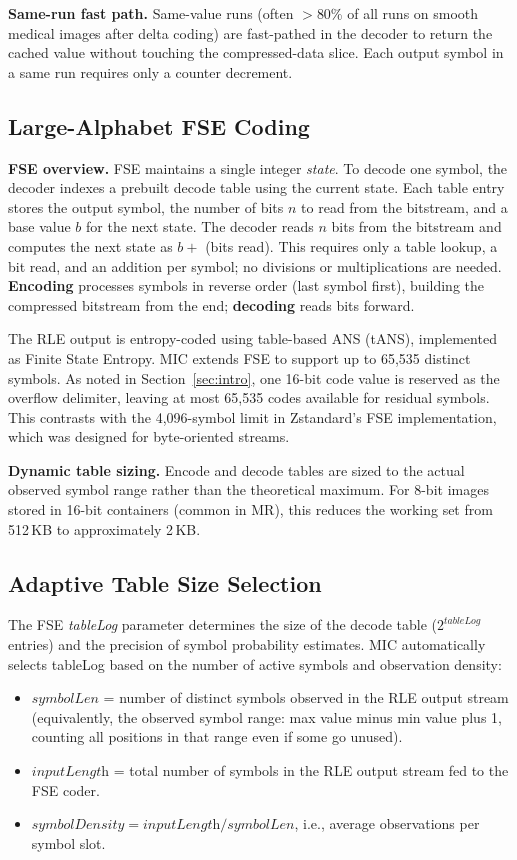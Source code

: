 \documentclass[journal]{IEEEtran}
\begin{document}
\textbf{Same-run fast path.} Same-value runs (often $>$80\% of all runs on
smooth medical images after delta coding) are fast-pathed in the decoder to
return the cached value without touching the compressed-data slice. Each output
symbol in a same run requires only a counter decrement.

\subsection{Large-Alphabet FSE Coding}

\textbf{FSE overview.} FSE maintains a single integer \emph{state}. To decode
one symbol, the decoder indexes a prebuilt decode table using the current state.
Each table entry stores the output symbol, the number of bits $n$ to read from
the bitstream, and a base value $b$ for the next state. The decoder reads $n$
bits from the bitstream and computes the next state as $b +$ (bits read). This
requires only a table lookup, a bit read, and an addition per symbol; no
divisions or multiplications are needed. \textbf{Encoding} processes symbols in
reverse order (last symbol first), building the compressed bitstream from the
end; \textbf{decoding} reads bits forward.

The RLE output is entropy-coded using table-based ANS (tANS), implemented as
Finite State Entropy. MIC extends FSE to support up to 65,535 distinct symbols.
As noted in Section~\ref{sec:intro}, one 16-bit code value is reserved as the
overflow delimiter, leaving at most 65,535 codes available for residual symbols.
This contrasts with the 4,096-symbol limit in Zstandard's FSE implementation,
which was designed for byte-oriented streams.

\textbf{Dynamic table sizing.} Encode and decode tables are sized to the actual
observed symbol range rather than the theoretical maximum. For 8-bit
images stored in 16-bit containers (common in MR), this reduces the working set
from 512\,KB to approximately 2\,KB.

\subsection{Adaptive Table Size Selection}

The FSE \emph{tableLog} parameter determines the size of the decode table
($2^{\textit{tableLog}}$ entries) and the precision of symbol probability
estimates. MIC automatically selects tableLog based on the number of active
symbols and observation density:
\begin{itemize}
  \item $\textit{symbolLen}$ = number of distinct symbols observed in the RLE
  output stream (equivalently, the observed symbol range: max value minus
  min value plus 1, counting all positions in that range even if some go
  unused).
  \item $\textit{inputLength}$ = total number of symbols in the RLE output
  stream fed to the FSE coder.
  \item $\textit{symbolDensity} = \textit{inputLength} / \textit{symbolLen}$,
  i.e., average observations per symbol slot.
\end{itemize}
\end{document}

